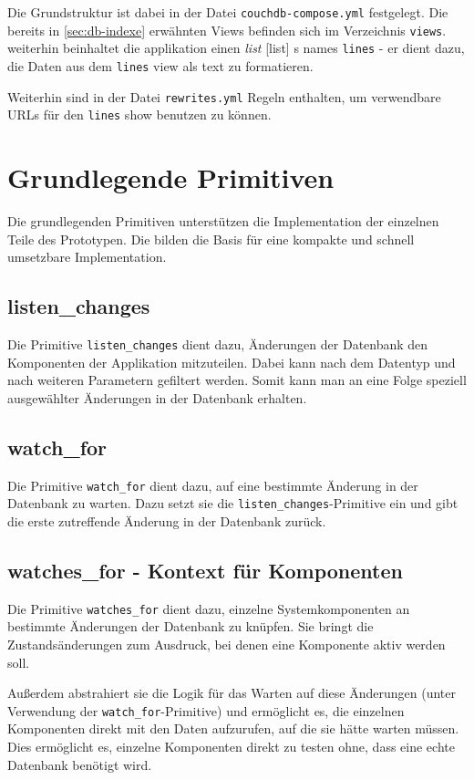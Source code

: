 Die Grundstruktur ist dabei in der Datei \verb|couchdb-compose.yml| festgelegt.
Die bereits in \cref{sec:db-indexe} erwähnten Views befinden sich im Verzeichnis \verb|views|.
weiterhin beinhaltet die applikation einen \emph{list} \cite{couchdb:guide}[list] s names \verb|lines| - er dient dazu, die Daten aus dem \verb|lines| view als text zu formatieren.

Weiterhin sind in der Datei \verb|rewrites.yml| Regeln enthalten, um verwendbare URLs für den \verb|lines| show benutzen zu können.

\section{Grundlegende Primitiven}
\label{sec:imp:primitiven}

Die grundlegenden Primitiven unterstützen die Implementation der einzelnen Teile des Prototypen. Die bilden die Basis für eine kompakte und schnell umsetzbare Implementation.

\subsection{listen\_changes}

Die Primitive \verb|listen_changes| dient dazu,
Änderungen der Datenbank den Komponenten der Applikation mitzuteilen.
Dabei kann nach dem Datentyp und nach weiteren Parametern gefiltert werden.
Somit kann man an eine Folge speziell ausgewählter Änderungen in der Datenbank erhalten.

\subsection{watch\_for}

Die Primitive \verb|watch_for| dient dazu, auf eine bestimmte Änderung in der Datenbank zu warten. Dazu setzt sie die \verb|listen_changes|-Primitive ein und gibt die erste zutreffende Änderung in der Datenbank zurück.

\subsection{watches\_for - Kontext für Komponenten}

Die Primitive \verb|watches_for| dient dazu, einzelne Systemkomponenten
an bestimmte Änderungen der Datenbank zu knüpfen.
Sie bringt die Zustandsänderungen zum Ausdruck,
bei denen eine Komponente aktiv werden soll.

Außerdem abstrahiert sie die Logik für das Warten auf diese Änderungen
(unter Verwendung der \verb|watch_for|-Primitive)
und ermöglicht es, die einzelnen Komponenten direkt mit den Daten aufzurufen,
auf die sie hätte warten müssen.
Dies ermöglicht es, einzelne Komponenten direkt zu testen ohne, dass eine echte Datenbank benötigt wird.

